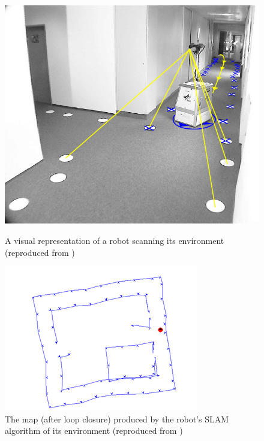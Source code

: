 \documentclass[12pt]{article}
\begin{document}
\begin{figure}[h]
    \centering
    \begin{minipage}{0.45\textwidth}
        \centering
        \includegraphics[width=\linewidth]{SLAM_agent} %
        \caption[Short caption]{A visual representation of a robot scanning its environment (reproduced from \cite{SLAM_overview})}
        \label{fig:SLAM_agent}
    \end{minipage}\hfill
    \begin{minipage}{0.45\textwidth}
        \centering
        \includegraphics[width=\linewidth]{SLAM_map} %
        \caption[Short caption]{The map (after loop closure) produced by the robot's SLAM algorithm of its environment (reproduced from \cite{SLAM_overview})}
        \label{fig:SLAM_map}
    \end{minipage}
\end{figure}
\end{document}
